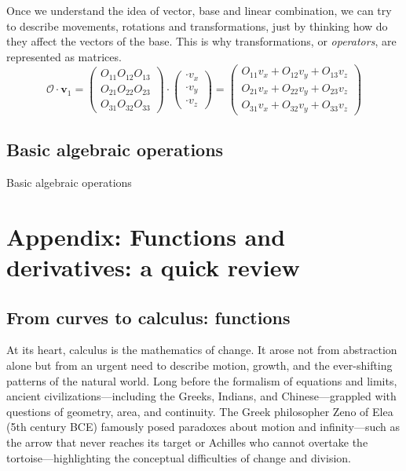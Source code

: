 \documentclass{book}
\begin{document}
Once we understand the idea of vector, base and linear combination, we can try to describe movements, rotations and transformations, just by thinking how do they affect the vectors of the base. This is why transformations, or \textit{operators}, are represented as matrices.
\begin{equation}
	\mathcal{O} \cdot \mathbf{v}_1 =
	\begin{pmatrix}
		O_{11} O_{12} O_{13} \\
		O_{21} O_{22} O_{23} \\
		O_{31} O_{32} O_{33}
	\end{pmatrix} \cdot \begin{pmatrix} \cdot v_{x} \\ \cdot v_{y} \\ \cdot v_{z} \end{pmatrix} =
	\begin{pmatrix}
		O_{11} v_{x} + O_{12} v_{y} + O_{13} v_{z} \\
		O_{21} v_{x} + O_{22} v_{y} + O_{23} v_{z} \\
		O_{31} v_{x} + O_{32} v_{y} + O_{33} v_{z}
	\end{pmatrix}
\end{equation}

\section{Basic algebraic operations}

Basic algebraic operations



\chapter{Appendix: Functions and derivatives: a quick review}

\section{From curves to calculus: functions}

At its heart, calculus is the mathematics of change. It arose not from abstraction alone but from an urgent need to describe motion, growth, and the ever-shifting patterns of the natural world. Long before the formalism of equations and limits, ancient civilizations---including the Greeks, Indians, and Chinese---grappled with questions of geometry, area, and continuity. The Greek philosopher Zeno of Elea (5th century BCE) famously posed paradoxes about motion and infinity---such as the arrow that never reaches its target or Achilles who cannot overtake the tortoise---highlighting the conceptual difficulties of change and division.\\
\end{document}
